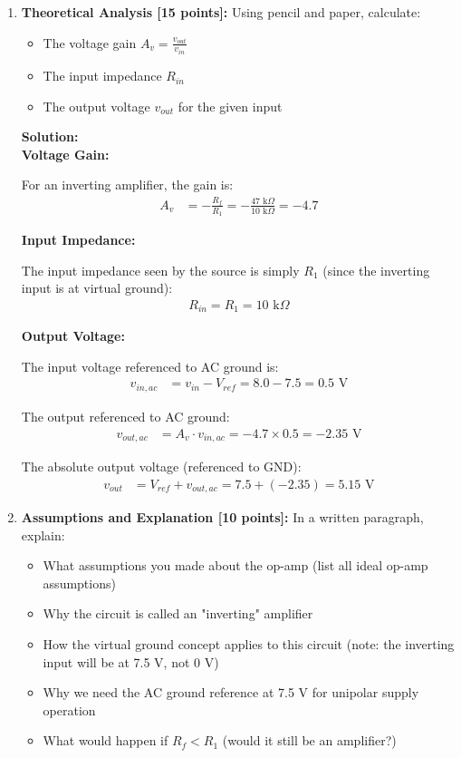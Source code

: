 \documentclass[11pt]{article}
\newenvironment{solution}
    {\color{blue}\textbf{Solution:}\\}
    {}
\begin{document}
\begin{enumerate}[label=\textbf{1.\arabic*}]
    \item \textbf{Theoretical Analysis [15 points]:} Using pencil and paper, calculate:
    \begin{itemize}
        \item The voltage gain $A_v = \frac{v_{out}}{v_{in}}$
        \item The input impedance $R_{in}$
        \item The output voltage $v_{out}$ for the given input
    \end{itemize}
    
\begin{solution}
\textbf{Voltage Gain:}

For an inverting amplifier, the gain is:
\begin{align*}
A_v &= -\frac{R_f}{R_1} = -\frac{47\text{ k}\Omega}{10\text{ k}\Omega} = -4.7
\end{align*}

\textbf{Input Impedance:}

The input impedance seen by the source is simply $R_1$ (since the inverting input is at virtual ground):
\begin{align*}
R_{in} = R_1 = 10\text{ k}\Omega
\end{align*}

\textbf{Output Voltage:}

The input voltage referenced to AC ground is:
\begin{align*}
v_{in,ac} &= v_{in} - V_{ref} = 8.0 - 7.5 = 0.5\text{ V}
\end{align*}

The output referenced to AC ground:
\begin{align*}
v_{out,ac} &= A_v \cdot v_{in,ac} = -4.7 \times 0.5 = -2.35\text{ V}
\end{align*}

The absolute output voltage (referenced to GND):
\begin{align*}
v_{out} &= V_{ref} + v_{out,ac} = 7.5 + (-2.35) = 5.15\text{ V}
\end{align*}
\end{solution}

\vspace{1cm}
    
    \item \textbf{Assumptions and Explanation [10 points]:} In a written paragraph, explain:
    \begin{itemize}
        \item What assumptions you made about the op-amp (list all ideal op-amp assumptions)
        \item Why the circuit is called an "inverting" amplifier
        \item How the virtual ground concept applies to this circuit (note: the inverting input will be at 7.5 V, not 0 V)
        \item Why we need the AC ground reference at 7.5 V for unipolar supply operation
        \item What would happen if $R_f < R_1$ (would it still be an amplifier?)
    \end{itemize}
    

\end{enumerate}
\end{document}
